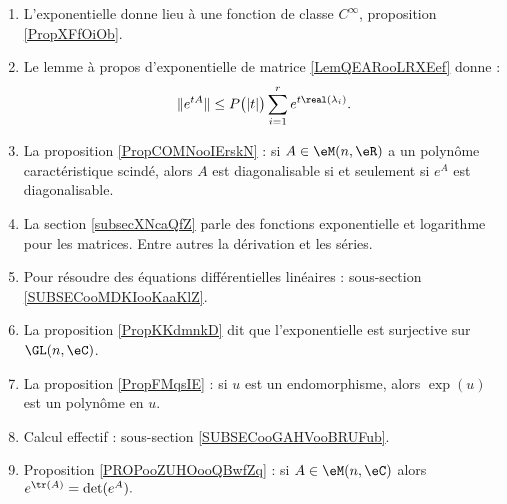 \begin{description}
\begin{enumerate}
    \item
        L'exponentielle donne lieu à une fonction de classe \(  C^{\infty}\), proposition \ref{PropXFfOiOb}.
    \item
            Le lemme à propos d'exponentielle de matrice \ref{LemQEARooLRXEef} donne :
            \begin{equation}
                \|  e^{tA} \|\leq P\big( | t | \big)\sum_{i=1}^r e^{t\real(\lambda_i)}.
            \end{equation}
        \item
            La proposition \ref{PropCOMNooIErskN} : si \( A\in \eM(n,\eR)\) a un polynôme caractéristique scindé, alors \( A\) est diagonalisable si et seulement si \( e^A\) est diagonalisable.
\item
    La section \ref{subsecXNcaQfZ} parle des fonctions exponentielle et logarithme pour les matrices. Entre autres la dérivation et les séries.
\item
    Pour résoudre des équations différentielles linéaires : sous-section \ref{SUBSECooMDKIooKaaKlZ}.
\item
    La proposition \ref{PropKKdmnkD} dit que l'exponentielle est surjective sur \( \GL(n,\eC)\).
\item

La proposition \ref{PropFMqsIE} : si \( u\) est un endomorphisme, alors \( \exp(u)\) est un polynôme en \( u\).
\item
    Calcul effectif : sous-section \ref{SUBSECooGAHVooBRUFub}.
\item Proposition \ref{PROPooZUHOooQBwfZq} : si \( A\in\eM(n,\eC)\) alors $ e^{\tr(A)}=\det( e^{A}).$

\end{enumerate}
\end{description}
